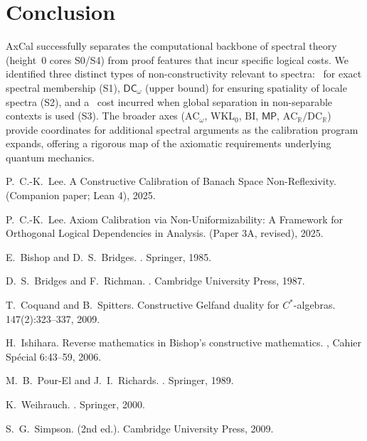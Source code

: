 \documentclass[11pt]{article}
\newcommand{\WLPO}{\mathsf{WLPO}}
\newcommand{\DCw}{\mathsf{DC}_{\omega}}
\newcommand{\MP}{\mathsf{MP}}
\theoremstyle{plain}
\theoremstyle{definition}
\theoremstyle{remark}
\newcommand{\ACw}{\mathrm{AC}_\omega}
\newcommand{\ACR}{\mathrm{AC}_{\mathbb{R}}}
\newcommand{\DCR}{\mathrm{DC}_{\mathbb{R}}}
\newcommand{\WKLz}{\mathrm{WKL}_0}
\newcommand{\BI}{\mathrm{BI}}
\begin{document}
\section{Conclusion}

AxCal successfully separates the computational backbone of spectral theory (height~0 cores S0/S4) from proof features that incur specific logical costs.
We identified three distinct types of non-constructivity relevant to spectra:
\MP\ for exact spectral membership (S1), $\DCw$ (upper bound) for ensuring spatiality of locale spectra (S2), and a \WLPO\ cost incurred when global separation in non-separable contexts is used (S3).
The broader axes ($\ACw$, $\WKLz$, $\BI$, $\MP$, $\ACR/\DCR$) provide coordinates for additional spectral arguments as the calibration program expands, offering a rigorous map of the axiomatic requirements underlying quantum mechanics.

\bigskip


\begin{thebibliography}{99}

P.~C.-K.~Lee.
\newblock A Constructive Calibration of Banach Space Non-Reflexivity.
\newblock (Companion paper; Lean 4), 2025.

P.~C.-K.~Lee.
\newblock Axiom Calibration via Non-Uniformizability: A Framework for Orthogonal Logical Dependencies in Analysis.
\newblock (Paper 3A, revised), 2025.

E.~Bishop and D.~S.~Bridges.
.
\newblock Springer, 1985.

D.~S.~Bridges and F.~Richman.
.
\newblock Cambridge University Press, 1987.

T.~Coquand and B.~Spitters.
\newblock Constructive Gelfand duality for $C^*$-algebras.
 147(2):323--337, 2009.

H.~Ishihara.
\newblock Reverse mathematics in {B}ishop's constructive mathematics.
, Cahier Sp\'ecial 6:43--59, 2006.

M.~B.~Pour-El and J.~I.~Richards.
.
\newblock Springer, 1989.

K.~Weihrauch.
.
\newblock Springer, 2000.

S.~G.~Simpson.
 (2nd ed.).
\newblock Cambridge University Press, 2009.

\end{thebibliography}
\end{document}
